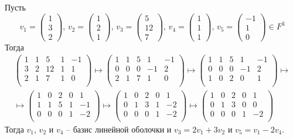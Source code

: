 \documentclass{article}
\begin{document}
Пусть 
\[
v_1 =
\begin{pmatrix}
{1}\\{3}\\{2}
\end{pmatrix},\,
v_2 =
\begin{pmatrix}
{1}\\{2}\\{1}
\end{pmatrix},\,
v_3 =
\begin{pmatrix}
{5}\\{12}\\{7}
\end{pmatrix},\,
v_4 =
\begin{pmatrix}
{1}\\{1}\\{1}
\end{pmatrix},\,
v_5 =
\begin{pmatrix}
{-1}\\{1}\\{0}
\end{pmatrix}\in F^3
\]
Тогда
\begin{gather*}
\begin{pmatrix}
{1}&{1}&{5}&{1}&{-1}\\
{3}&{2}&{12}&{1}&{1}\\
{2}&{1}&{7}&{1}&{0}\\
\end{pmatrix}\mapsto
\begin{pmatrix}
{1}&{1}&{5}&{1}&{-1}\\
{0}&{0}&{0}&{-1}&{2}\\
{2}&{1}&{7}&{1}&{0}\\
\end{pmatrix}\mapsto
\begin{pmatrix}
{1}&{1}&{5}&{1}&{-1}\\
{0}&{0}&{0}&{-1}&{2}\\
{1}&{0}&{2}&{0}&{1}\\
\end{pmatrix}\mapsto\\\mapsto
\begin{pmatrix}
{1}&{0}&{2}&{0}&{1}\\
{1}&{1}&{5}&{1}&{-1}\\
{0}&{0}&{0}&{1}&{-2}\\
\end{pmatrix}\mapsto
\begin{pmatrix}
{1}&{0}&{2}&{0}&{1}\\
{0}&{1}&{3}&{1}&{-2}\\
{0}&{0}&{0}&{1}&{-2}\\
\end{pmatrix}\mapsto
\begin{pmatrix}
{1}&{0}&{2}&{0}&{1}\\
{0}&{1}&{3}&{0}&{0}\\
{0}&{0}&{0}&{1}&{-2}\\
\end{pmatrix}
\end{gather*}
Тогда $v_1$, $v_2$ и $v_4$ -- базис линейной оболочки и $v_3 = 2v_1 + 3 v_2$ и $v_5 = v_1 - 2 v_4$.
\end{document}
